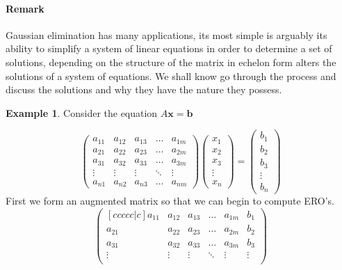 \documentclass[12pt,reqno,twoside,titlepage]{article}
\theoremstyle{definition}
\newtheorem{exmp}{Example}[section]
\begin{document}
\paragraph{Remark}
Gaussian elimination has many applications, its most simple is arguably its ability to simplify a system of linear equations in order to determine a set of solutions, depending on the structure of the matrix in echelon form alters the solutions of a system of equations. 
\newline
We shall know go through the process and discuss the solutions and why they have the nature they possess. \begin{exmp}
Consider the equation $A\textbf{x} = \textbf{b}$

\begin{equation*}
    \begin{pmatrix}
    a_{11} & a_{12} & a_{13} & \dots & a_{1m} \\
    a_{21} & a_{22} & a_{23} & \dots & a_{2m} \\
    a_{31} & a_{32} & a_{33} & \dots & a_{3m} \\
    \vdots & \vdots & \vdots & \ddots & \vdots \\
    a_{n1} & a_{n2} & a_{n3} & \dots & a_{nm}
    \end{pmatrix}
    \begin{pmatrix}
    x_{1} \\
    x_{2} \\
    x_{3} \\
    \vdots \\
    x_{n}
    \end{pmatrix}
    =
    \begin{pmatrix}
    b_{1} \\
    b_{2} \\
    b_{3} \\
    \vdots \\
    b_{n}
    \end{pmatrix}
\end{equation*}
\newline
First we form an augmented matrix so that we can begin to compute ERO’s.
\begin{equation*}
\begin{pmatrix}[ccccc|c]
a_{11} & a_{12} & a_{13} & \dots & a_{1m} & b_{1} \\
a_{21} & a_{22} & a_{23} & \dots & a_{2m} & b_{2} \\
a_{31} & a_{32} & a_{33} & \dots & a_{3m} & b_{3} \\
\vdots & \vdots & \vdots & \ddots & \vdots & \vdots \\

\end{pmatrix}
\end{equation*}
\end{exmp}
\end{document}
